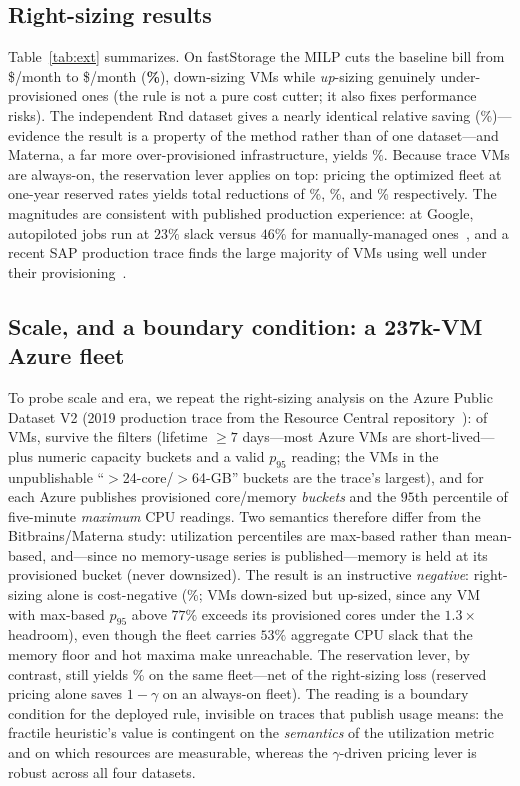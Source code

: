 \documentclass[10pt,journal]{IEEEtran}
\begin{document}
\subsection{Right-sizing results}
Table~\ref{tab:ext} summarizes. On fastStorage the MILP cuts the baseline
bill from \$\extFsBaseline/month to \$\extFsOptimized/month
(\textbf{\extFsSavingsPct\%}), down-sizing \extFsDownsized{} VMs while
\emph{up}-sizing \extFsUpsized{} genuinely under-provisioned ones (the rule
is not a pure cost cutter; it also fixes performance risks). The independent
Rnd dataset gives a nearly identical relative saving
(\extRndSavingsPct\%)---evidence the result is a property of the method
rather than of one dataset---and Materna, a far more over-provisioned
infrastructure, yields \extMatSavingsPct\%. Because trace VMs are always-on,
the reservation lever applies on top: pricing the optimized fleet at
one-year reserved rates yields total reductions of \extFsSavingsPctRi\%,
\extRndSavingsPctRi\%, and \extMatSavingsPctRi\% respectively. The
magnitudes are consistent with published production experience: at Google,
autopiloted jobs run at $23\%$ slack versus $46\%$ for manually-managed
ones~\cite{rzadca2020autopilot}, and a recent SAP production trace finds
the large majority of VMs using well under their
provisioning~\cite{uhlig2025sap}.

\subsection{Scale, and a boundary condition: a 237k-VM Azure fleet}
\label{sec:ext:azure}
To probe scale and era, we repeat the right-sizing analysis on the Azure
Public Dataset V2 (2019 production trace from the Resource Central
repository~\cite{cortez2017resource}): of \azTotalRows{} VMs, \azVms{}
survive the filters (lifetime $\ge7$ days---most Azure VMs are
short-lived---plus numeric capacity buckets and a valid $p_{95}$ reading;
the \azDroppedBucket{} VMs in the unpublishable ``$>$24-core/$>$64-GB''
buckets are the trace's largest), and for each Azure publishes provisioned
core/memory \emph{buckets} and the $95$th percentile of five-minute
\emph{maximum} CPU readings. Two semantics therefore differ from the Bitbrains/Materna study:
utilization percentiles are max-based rather than mean-based, and---since
no memory-usage series is published---memory is held at its provisioned
bucket (never downsized). The result is an instructive \emph{negative}:
right-sizing alone is cost-negative (\azSavingsPct\%; \azDownsized{} VMs
down-sized but \azUpsized{} up-sized, since any VM with max-based
$p_{95}$ above $77\%$ exceeds its provisioned cores under the $1.3\times$
headroom), even though the fleet carries $53\%$ aggregate CPU slack that
the memory floor and hot maxima make unreachable. The reservation lever,
by contrast, still yields \azSavingsPctRi\% on the same fleet---net of the
right-sizing loss (reserved pricing alone saves $1{-}\gamma$ on an
always-on fleet). The reading
is a boundary condition for the deployed rule, invisible on traces that
publish usage means: the fractile heuristic's value is contingent on the
\emph{semantics} of the utilization metric and on which resources are
measurable, whereas the $\gamma$-driven pricing lever is robust across all
four datasets.
\end{document}
